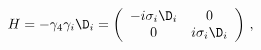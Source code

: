\begin{equation}
\label{Dirac-Hamiltonian}
H = - \gamma_4 \gamma_i \D_i = \left( \begin{array}{cc}
                - i \sigma_i \D_i & 0 \\
                0 & i \sigma_i \D_i
                \end{array} \right) \, , 
\end{equation}

